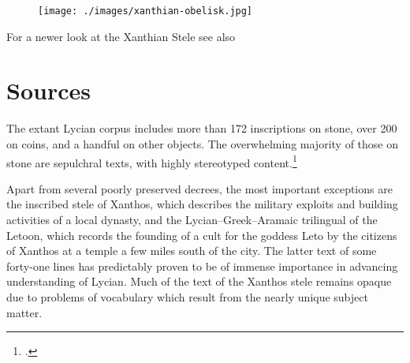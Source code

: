 \begin{figure}[htb]
\begin{minipage}[b]{0.5\textwidth}
\texttt{[image: ./images/xanthian-obelisk.jpg]}
\end{minipage}\hspace*{1em}
\begin{minipage}[b]{0.45\textwidth}
\end{minipage}
\end{figure}


For a newer look at the Xanthian Stele see also \cite{Gygax2005}

\section{Sources}

The extant Lycian corpus includes more than 172 inscriptions on stone, over 200 on coins, 
and a handful on other objects. The overwhelming majority of
those on stone are sepulchral texts, with highly stereotyped content.\footcite{Woodard2008} 


Apart from several poorly preserved decrees, the most important exceptions are the inscribed stele of Xanthos,
which describes the military exploits and building activities of a local dynasty, and the
Lycian–Greek–Aramaic trilingual of the Letoon, which records the founding of a cult for
the goddess Leto by the citizens of Xanthos at a temple a few miles south of the city. The
latter text of some forty-one lines has predictably proven to be of immense importance in
advancing understanding of Lycian. Much of the text of the Xanthos stele remains opaque
due to problems of vocabulary which result from the nearly unique subject matter.


